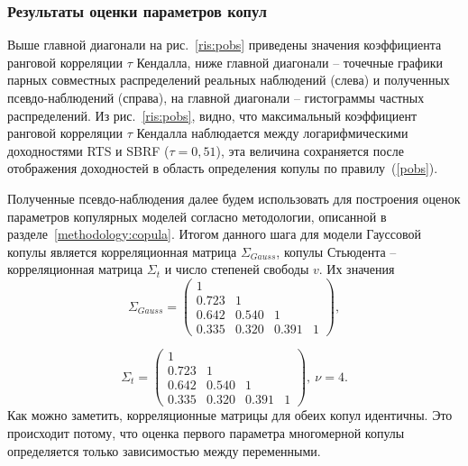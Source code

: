 
\subsubsection{Результаты оценки параметров копул}



Выше главной диагонали на рис.~\ref{ris:pobs} приведены значения
коэффициента ранговой корреляции $\tau$ Кендалла, ниже главной
диагонали -- точечные графики парных совместных распределений
реальных наблюдений (слева) и полученных псевдо-наблюдений
(справа), на главной диагонали -- гистограммы частных
распределений. Из рис.~\ref{ris:pobs}, видно, что максимальный
коэффициент ранговой корреляции $\tau$ Кендалла наблюдается между
логарифмическими доходностями RTS и SBRF ($\tau=0,51$), эта
величина сохраняется после отображения доходностей в область
определения копулы по правилу~(\ref{pobs}).


Полученные псевдо-наблюдения далее будем использовать для построения оценок параметров копулярных моделей согласно методологии, описанной в разделе~\ref{methodology:copula}.
Итогом данного шага для модели Гауссовой копулы является корреляционная матрица $ \Sigma_{Gauss}$, копулы Стьюдента -- корреляционная матрица $ \Sigma_{t}$ и число степеней свободы $v$. Их значения
%
\begin{equation} \label{gausscopfit}
    \Sigma_{Gauss} = \left(
    \begin{array}{cccc}
        1 & & & \\
        0.723 & 1 & & \\
        0.642 & 0.540 & 1 & \\
        0.335 & 0.320 & 0.391 & 1
    \end{array} \right),
\end{equation}

\begin{equation} \label{tcopfit}
    \Sigma_t = \left(
    \begin{array}{cccc}
        1 & & & \\
        0.723 & 1 & & \\
        0.642 & 0.540 & 1 & \\
        0.335 & 0.320 & 0.391 & 1
    \end{array} \right), \ \nu = 4.
\end{equation}
%
Как можно заметить, корреляционные матрицы для обеих копул идентичны. %
Это происходит потому, что оценка первого параметра многомерной копулы определяется только зависимостью между переменными.

